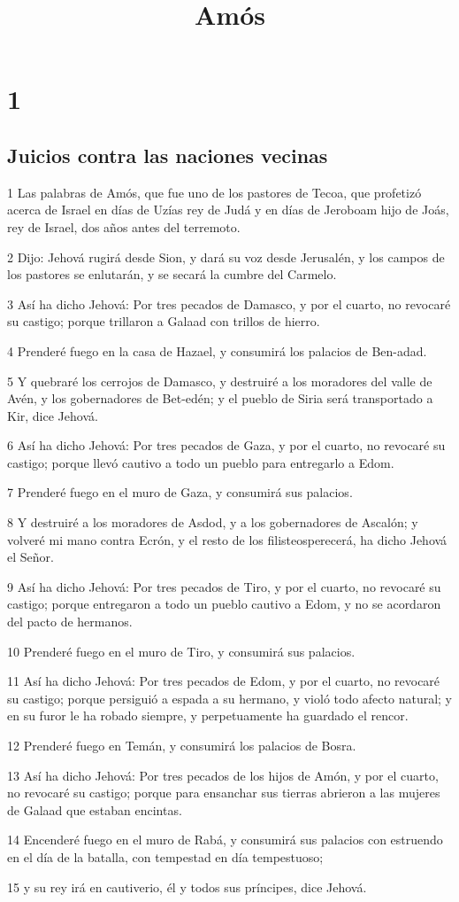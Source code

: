 

\title{Amós}

\chapter{1}

\section*{Juicios contra las naciones vecinas}

\par 1 Las palabras de Amós, que fue uno de los pastores de Tecoa, que profetizó acerca de Israel en días de Uzías rey de Judá y en días de Jeroboam hijo de Joás, rey de Israel, dos años antes del terremoto.
\par 2 Dijo: Jehová rugirá desde Sion, y dará su voz desde Jerusalén, y los campos de los pastores se enlutarán, y se secará la cumbre del Carmelo.
\par 3 Así ha dicho Jehová: Por tres pecados de Damasco, y por el cuarto, no revocaré su castigo; porque trillaron a Galaad con trillos de hierro.
\par 4 Prenderé fuego en la casa de Hazael, y consumirá los palacios de Ben-adad.
\par 5 Y quebraré los cerrojos de Damasco, y destruiré a los moradores del valle de Avén, y los gobernadores de Bet-edén; y el pueblo de Siria será transportado a Kir, dice Jehová.
\par 6 Así ha dicho Jehová: Por tres pecados de Gaza, y por el cuarto, no revocaré su castigo; porque llevó cautivo a todo un pueblo para entregarlo a Edom.
\par 7 Prenderé fuego en el muro de Gaza, y consumirá sus palacios.
\par 8 Y destruiré a los moradores de Asdod, y a los gobernadores de Ascalón; y volveré mi mano contra Ecrón, y el resto de los filisteosperecerá, ha dicho Jehová el Señor.
\par 9 Así ha dicho Jehová: Por tres pecados de Tiro, y por el cuarto, no revocaré su castigo; porque entregaron a todo un pueblo cautivo a Edom, y no se acordaron del pacto de hermanos.
\par 10 Prenderé fuego en el muro de Tiro, y consumirá sus palacios.
\par 11 Así ha dicho Jehová: Por tres pecados de Edom, y por el cuarto, no revocaré su castigo; porque persiguió a espada a su hermano, y violó todo afecto natural; y en su furor le ha robado siempre, y perpetuamente ha guardado el rencor.
\par 12 Prenderé fuego en Temán, y consumirá los palacios de Bosra.
\par 13 Así ha dicho Jehová: Por tres pecados de los hijos de Amón, y por el cuarto, no revocaré su castigo; porque para ensanchar sus tierras abrieron a las mujeres de Galaad que estaban encintas.
\par 14 Encenderé fuego en el muro de Rabá, y consumirá sus palacios con estruendo en el día de la batalla, con tempestad en día tempestuoso;
\par 15 y su rey irá en cautiverio, él y todos sus príncipes, dice Jehová.

